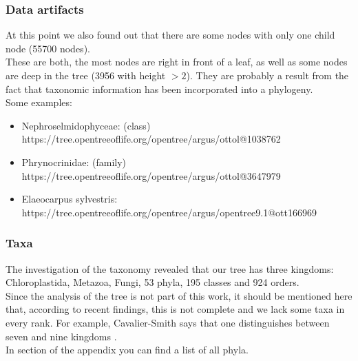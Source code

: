       \subsubsection{Data artifacts}
        At this point we also found out that there are some nodes with only one child node (55700 nodes). \\
        These are both, the most nodes are right in front of a leaf, as well as some nodes are deep in the 
          tree (3956 with height $>2$). They are probably a result from the fact that taxonomic information 
          has been incorporated into a phylogeny. \\
        Some examples:
        \begin{itemize}
          \item Nephroselmidophyceae: (class) \\
            https://tree.opentreeoflife.org/opentree/argus/ottol@1038762
          \item Phrynocrinidae: (family) \\
            https://tree.opentreeoflife.org/opentree/argus/ottol@3647979
          \item Elaeocarpus sylvestris: \\
            https://tree.opentreeoflife.org/opentree/argus/opentree9.1@ott166969
        \end{itemize}

      \subsubsection{Taxa}
        The investigation of the taxonomy revealed that our tree has three kingdoms: Chloroplastida, 
          Metazoa, Fungi, 53 phyla, 195 classes and 924 orders. \\
        Since the analysis of the tree is not part of this work, it should be mentioned here that, 
          according to recent findings, this is not complete and we lack some taxa in every rank. For 
          example, Cavalier-Smith says that one distinguishes between seven and nine kingdoms 
          \cite{CavalierSmith1981}. \\
        In section \pageref{subsec:listPhyla} of the appendix you can find a list of all phyla.

